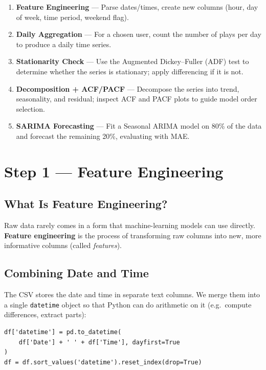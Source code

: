 \documentclass[12pt, a4paper]{article}
\begin{document}
\begin{enumerate}
    \item \textbf{Feature Engineering} — Parse dates/times, create new
          columns (hour, day of week, time period, weekend flag).
    \item \textbf{Daily Aggregation} — For a chosen user, count the number
          of plays per day to produce a daily time series.
    \item \textbf{Stationarity Check} — Use the Augmented Dickey--Fuller
          (ADF) test to determine whether the series is stationary; apply
          differencing if it is not.
    \item \textbf{Decomposition + ACF/PACF} — Decompose the series into
          trend, seasonality, and residual; inspect ACF and PACF plots to
          guide model order selection.
    \item \textbf{SARIMA Forecasting} — Fit a Seasonal ARIMA model on 80\%
          of the data and forecast the remaining 20\%, evaluating with MAE.
\end{enumerate}

\section{Step 1 — Feature Engineering}

\subsection{What Is Feature Engineering?}
Raw data rarely comes in a form that machine-learning models can use directly.
\textbf{Feature engineering} is the process of transforming raw columns into
new, more informative columns (called \emph{features}).

\subsection{Combining Date and Time}
The CSV stores the date and time in separate text columns. We merge them into
a single \texttt{datetime} object so that Python can do arithmetic on it
(e.g.\ compute differences, extract parts):

\begin{lstlisting}
df['datetime'] = pd.to_datetime(
    df['Date'] + ' ' + df['Time'], dayfirst=True
)
df = df.sort_values('datetime').reset_index(drop=True)
\end{lstlisting}
\end{document}
